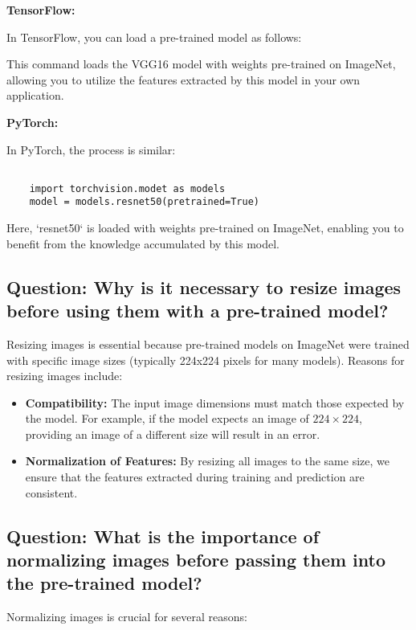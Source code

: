 \documentclass{article}
\begin{document}
\textbf{TensorFlow:} 

In TensorFlow, you can load a pre-trained model as follows:


This command loads the VGG16 model with weights pre-trained on ImageNet, allowing you to utilize the features extracted by this model in your own application.

\textbf{PyTorch:} 

In PyTorch, the process is similar:

\begin{lstlisting}

    import torchvision.modet as models
    model = models.resnet50(pretrained=True)
\end{lstlisting}

Here, `resnet50` is loaded with weights pre-trained on ImageNet, enabling you to benefit from the knowledge accumulated by this model.

\subsection{Question: Why is it necessary to resize images before using them with a pre-trained model?}

\justify
Resizing images is essential because pre-trained models on ImageNet were trained with specific image sizes (typically 224x224 pixels for many models). Reasons for resizing images include:

\begin{itemize}
    \item \textbf{Compatibility:} The input image dimensions must match those expected by the model. For example, if the model expects an image of \(224 \times 224\), providing an image of a different size will result in an error.
    \item \textbf{Normalization of Features:} By resizing all images to the same size, we ensure that the features extracted during training and prediction are consistent.
\end{itemize}

\subsection{Question: What is the importance of normalizing images before passing them into the pre-trained model?}

\justify
Normalizing images is crucial for several reasons:
\end{document}
